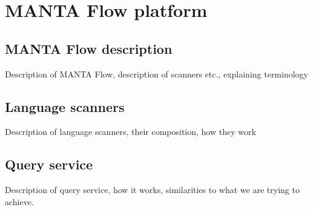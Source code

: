 \chapter{MANTA Flow platform}

\section{MANTA Flow description}
Description of MANTA Flow, description of scanners etc., explaining terminology
\section{Language scanners}
Description of language scanners, their composition, how they work
\section{Query service}
Description of query service, how it works, similarities to what we are trying to achieve.

